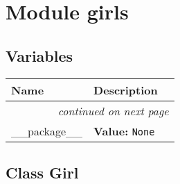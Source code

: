 %
%
%


\section{Module girls}

    \label{girls}


  \subsection{Variables}

    \vspace{-1cm}
\hspace{\varindent}\begin{longtable}{|p{\varnamewidth}|p{\vardescrwidth}|l}
\cline{1-2}
\cline{1-2} \centering \textbf{Name} & \centering \textbf{Description}& \\
\cline{1-2}
\endhead\cline{1-2}\multicolumn{3}{r}{\small\textit{continued on next page}}\\\endfoot\cline{1-2}
\endlastfoot\raggedright \_\-\_\-p\-a\-c\-k\-a\-g\-e\-\_\-\_\- & \raggedright \textbf{Value:} 
{\tt None}&\\
\cline{1-2}
\end{longtable}



\subsection{Class Girl}

    \label{girls:Girl}

